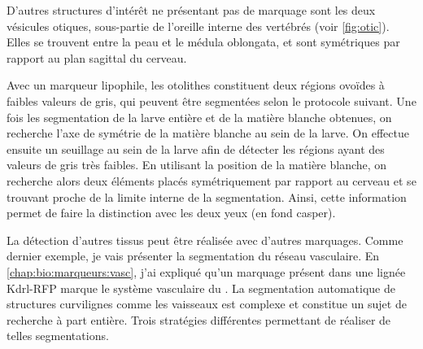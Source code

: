 \documentclass[\main/main.tex]{subfiles}
\begin{document}
%
D'autres structures d'intérêt ne présentant pas de marquage sont les deux vésicules otiques, sous-partie de l'oreille interne des vertébrés (voir \autoref{fig:otic}). Elles se trouvent entre la peau et le médula oblongata, et sont symétriques par rapport au plan sagittal du cerveau.

%
Avec un marqueur lipophile, les otolithes constituent deux régions ovoïdes à faibles valeurs de gris, qui peuvent être segmentées selon le protocole suivant.
Une fois les segmentation de la larve entière et de la matière blanche obtenues, on recherche l'axe de symétrie de la matière blanche au sein de la larve. On effectue ensuite un seuillage au sein de la larve afin de détecter les régions ayant des valeurs de gris très faibles. En utilisant la position de la matière blanche, on recherche alors deux éléments placés symétriquement par rapport au cerveau et se trouvant proche de la limite interne de la segmentation. Ainsi, cette information permet de faire la distinction avec les deux yeux (en fond casper).


%
La détection d'autres tissus peut être réalisée avec d'autres marquages. Comme dernier exemple, je vais présenter la segmentation du réseau vasculaire.
En \autoref{chap:bio:marqueurs:vasc}, j'ai expliqué qu'un marquage présent dans une lignée Kdrl-RFP marque le système vasculaire du \pz{}.
%
La segmentation automatique de structures curvilignes comme les vaisseaux est complexe et constitue un sujet de recherche à part entière. Trois stratégies différentes permettant de réaliser de telles segmentations.
\end{document}
